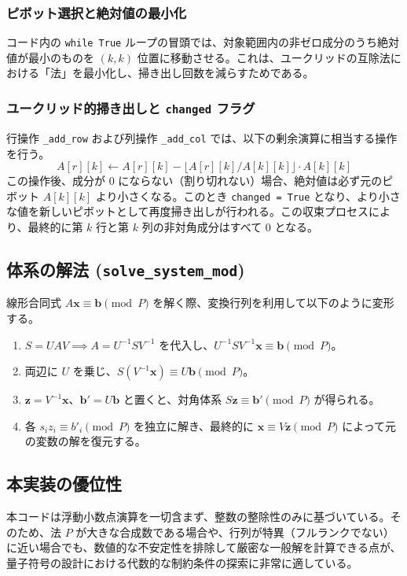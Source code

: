 \documentclass[a4paper,11pt,dvipdfmx]{jsarticle}
\theoremstyle{definition}
\begin{document}
\subsubsection{ピボット選択と絶対値の最小化}
コード内の \texttt{while True} ループの冒頭では、対象範囲内の非ゼロ成分のうち絶対値が最小のものを $(k, k)$ 位置に移動させる。これは、ユークリッドの互除法における「法」を最小化し、掃き出し回数を減らすためである。

\subsubsection{ユークリッド的掃き出しと \texttt{changed} フラグ}
行操作 \texttt{\_add\_row} および列操作 \texttt{\_add\_col} では、以下の剰余演算に相当する操作を行う。
\begin{equation}
    A[r][k] \leftarrow A[r][k] - \lfloor A[r][k] / A[k][k] \rfloor \cdot A[k][k]
\end{equation}
この操作後、成分が $0$ にならない（割り切れない）場合、絶対値は必ず元のピボット $A[k][k]$ より小さくなる。このとき \texttt{changed = True} となり、より小さな値を新しいピボットとして再度掃き出しが行われる。この収束プロセスにより、最終的に第 $k$ 行と第 $k$ 列の非対角成分はすべて $0$ となる。

\subsection{体系の解法 (\texttt{solve\_system\_mod})}
線形合同式 $A\mathbf{x} \equiv \mathbf{b} \pmod{P}$ を解く際、変換行列を利用して以下のように変形する。
\begin{enumerate}
    \item $S = UAV \implies A = U^{-1}SV^{-1}$ を代入し、$U^{-1}SV^{-1}\mathbf{x} \equiv \mathbf{b} \pmod{P}$。
    \item 両辺に $U$ を乗じ、$S(V^{-1}\mathbf{x}) \equiv U\mathbf{b} \pmod{P}$。
    \item $\mathbf{z} = V^{-1}\mathbf{x}$、$\mathbf{b}' = U\mathbf{b}$ と置くと、対角体系 $S\mathbf{z} \equiv \mathbf{b}' \pmod{P}$ が得られる。
    \item 各 $s_i z_i \equiv b'_i \pmod{P}$ を独立に解き、最終的に $\mathbf{x} \equiv V\mathbf{z} \pmod{P}$ によって元の変数の解を復元する。
\end{enumerate}

\subsection{本実装の優位性}
本コードは浮動小数点演算を一切含まず、整数の整除性のみに基づいている。そのため、法 $P$ が大きな合成数である場合や、行列が特異（フルランクでない）に近い場合でも、数値的な不安定性を排除して厳密な一般解を計算できる点が、量子符号の設計における代数的な制約条件の探索に非常に適している。
\end{document}
